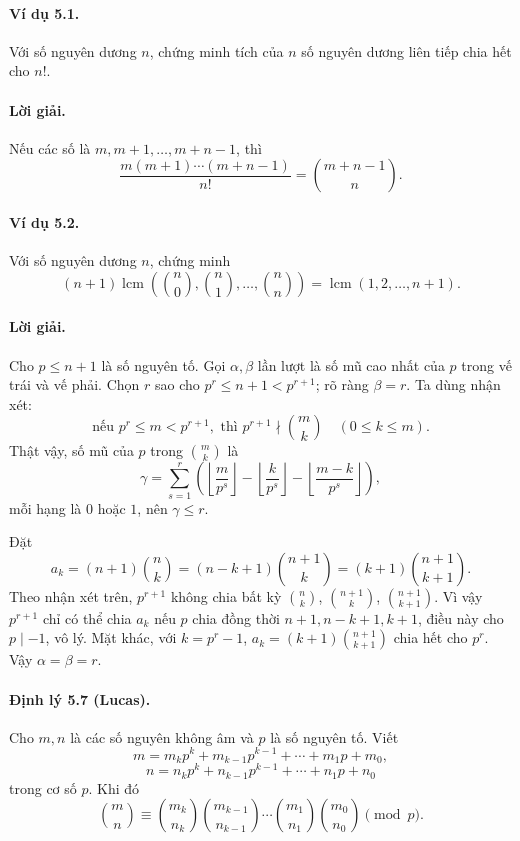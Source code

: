 \documentclass[11pt]{article}
\DeclareMathOperator{\lcm}{lcm}
\begin{document}
\paragraph{Ví dụ 5.1.}
Với số nguyên dương \(n\), chứng minh tích của \(n\) số nguyên dương liên tiếp
chia hết cho \(n!\).

\paragraph{Lời giải.}
Nếu các số là \(m,m+1,\ldots,m+n-1\), thì
\[
 \frac{m(m+1)\cdots(m+n-1)}{n!}=\binom{m+n-1}{n}.
\]

\paragraph{Ví dụ 5.2.}
Với số nguyên dương \(n\), chứng minh
\[
 (n+1)\lcm\left(\binom n0,\binom n1,\ldots,\binom nn\right)
 =\lcm(1,2,\ldots,n+1).
\]

\paragraph{Lời giải.}
Cho \(p\le n+1\) là số nguyên tố. Gọi \(\alpha,\beta\) lần lượt là số mũ cao
nhất của \(p\) trong vế trái và vế phải. Chọn \(r\) sao cho
\(p^r\le n+1<p^{r+1}\); rõ ràng \(\beta=r\). Ta dùng nhận xét:
\[
 \text{nếu }p^r\le m<p^{r+1},\text{ thì }p^{r+1}\nmid\binom mk
 \quad(0\le k\le m).
\]
Thật vậy, số mũ của \(p\) trong \(\binom mk\) là
\[
 \gamma=\sum_{s=1}^r\left(
\left\lfloor\frac m{p^s}\right\rfloor-
\left\lfloor\frac k{p^s}\right\rfloor-
\left\lfloor\frac{m-k}{p^s}\right\rfloor\right),
\]
mỗi hạng là \(0\) hoặc \(1\), nên \(\gamma\le r\).

Đặt
\[
 a_k=(n+1)\binom nk=(n-k+1)\binom{n+1}k=(k+1)\binom{n+1}{k+1}.
\]
Theo nhận xét trên, \(p^{r+1}\) không chia bất kỳ \(\binom nk\),
\(\binom{n+1}k\), \(\binom{n+1}{k+1}\). Vì vậy \(p^{r+1}\) chỉ có thể chia
\(a_k\) nếu \(p\) chia đồng thời \(n+1,n-k+1,k+1\), điều này cho
\(p\mid-1\), vô lý. Mặt khác, với \(k=p^r-1\), \(a_k=(k+1)\binom{n+1}{k+1}\)
chia hết cho \(p^r\). Vậy \(\alpha=\beta=r\).

\paragraph{Định lý 5.7 (Lucas).}
Cho \(m,n\) là các số nguyên không âm và \(p\) là số nguyên tố. Viết
\[
 m=m_kp^k+m_{k-1}p^{k-1}+\cdots+m_1p+m_0,
\]
\[
 n=n_kp^k+n_{k-1}p^{k-1}+\cdots+n_1p+n_0
\]
trong cơ số \(p\). Khi đó
\[
 \binom mn\equiv
 \binom{m_k}{n_k}\binom{m_{k-1}}{n_{k-1}}\cdots
 \binom{m_1}{n_1}\binom{m_0}{n_0}\pmod p.
\]
\end{document}
